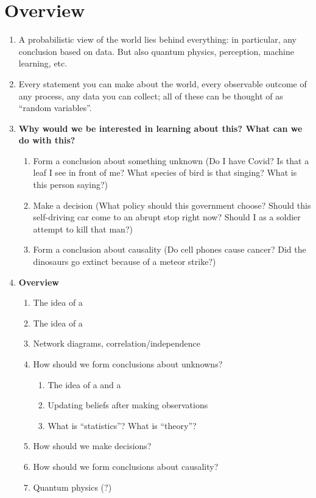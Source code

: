 \section{Overview}

\begin{enumerate}

\item A probabilistic view of the world lies behind everything: in particular, any conclusion based on data. But also quantum physics, perception, machine learning, etc.
\item Every statement you can make about the world, every observable outcome of any process, any data you can collect; all of these can be thought of as ``random variables​''.

\item {\bf Why would we be interested in learning about this? What can we do with this?}
  \begin{enumerate}
  \item Form a conclusion about something unknown (Do I have Covid? Is that a leaf I see in front of me? What species of bird is that singing? What is this person saying?)
  \item Make a decision (What policy should this government choose? Should this self-driving car come to an abrupt stop right now? Should I as a soldier attempt to kill that man?)
  \item Form a conclusion about causality (Do cell phones cause cancer? Did the dinosaurs go extinct because of a meteor strike?)
  \end{enumerate}

\item {\bf Overview}
  \begin{enumerate}
  \item The idea of a 
  \item The idea of a 
  \item Network diagrams, correlation/independence
  \item How should we form conclusions about unknowns?
    \begin{enumerate}
    \item The idea of a  and a 
    \item Updating beliefs after making observations
    \item What is ``statistics​''? What is ``theory​''?
    \end{enumerate}
  \item How should we make decisions?
  \item How should we form conclusions about causality?
  \item Quantum physics (?)
  \end{enumerate}


\end{enumerate}
